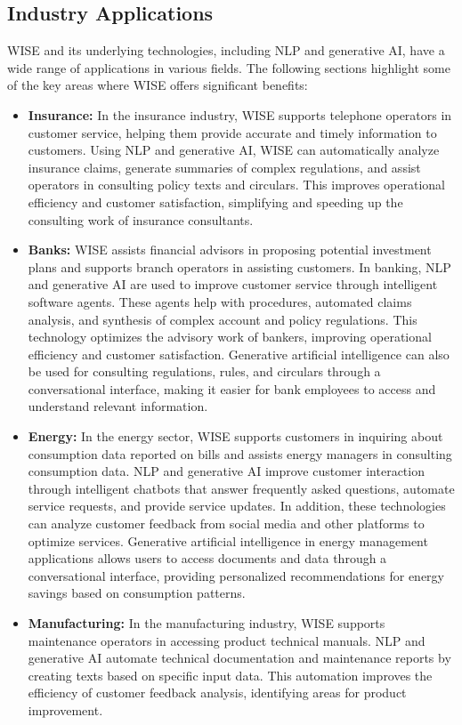 \subsection{Industry Applications}

WISE and its underlying technologies, including NLP and generative AI, have a wide range of applications in various fields. The following sections highlight some of the key areas where WISE offers significant benefits:

\begin{itemize}
    \item \textbf{Insurance:} In the insurance industry, WISE supports telephone operators in customer service, helping them provide accurate and timely information to customers. Using NLP and generative AI, WISE can automatically analyze insurance claims, generate summaries of complex regulations, and assist operators in consulting policy texts and circulars. This improves operational efficiency and customer satisfaction, simplifying and speeding up the consulting work of insurance consultants.
    \item \textbf{Banks:} WISE assists financial advisors in proposing potential investment plans and supports branch operators in assisting customers. In banking, NLP and generative AI are used to improve customer service through intelligent software agents. These agents help with procedures, automated claims analysis, and synthesis of complex account and policy regulations. This technology optimizes the advisory work of bankers, improving operational efficiency and customer satisfaction.
    Generative artificial intelligence can also be used for consulting regulations, rules, and circulars through a conversational interface, making it easier for bank employees to access and understand relevant information.
    \item \textbf{Energy:} In the energy sector, WISE supports customers in inquiring about consumption data reported on bills and assists energy managers in consulting consumption data. NLP and generative AI improve customer interaction through intelligent chatbots that answer frequently asked questions, automate service requests, and provide service updates. In addition, these technologies can analyze customer feedback from social media and other platforms to optimize services.
    Generative artificial intelligence in energy management applications allows users to access documents and data through a conversational interface, providing personalized recommendations for energy savings based on consumption patterns.
    \item \textbf{Manufacturing:} In the manufacturing industry, WISE supports maintenance operators in accessing product technical manuals. NLP and generative AI automate technical documentation and maintenance reports by creating texts based on specific input data. This automation improves the efficiency of customer feedback analysis, identifying areas for product improvement.
\end{itemize}


